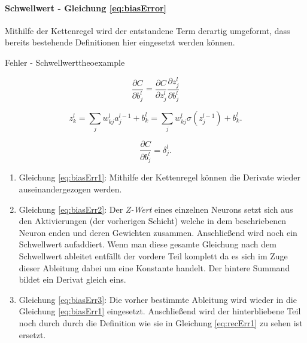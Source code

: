 \paragraph{Schwellwert - Gleichung \ref{eq:biasError}}
Mithilfe der Kettenregel wird der entstandene Term derartig umgeformt, dass bereits bestehende Definitionen hier eingesetzt werden können. 

\begin{myderivation}{Fehler - Schwellwert}{theoexample} 

\begin{equation} \label{eq:biasErr1}
\frac{\partial C}{\partial b^l_j} = \frac{\partial C}{\partial z^l_j} \frac{\partial z^l_j}{\partial b^l_j}
\end{equation}

\begin{equation} \label{eq:biasErr2}
z^{l}_k = \sum_j w^{l}_{kj} a^{l-1}_j +b^l_k = \sum_j w^l_{kj} \sigma(z^{l-1}_j) +b^l_k.
\end{equation}


\begin{equation} \label{eq:biasErr3}
\frac{\partial C}{\partial b^l_j} = \delta^l_j.
\end{equation}

\end{myderivation}


\begin{enumerate}

\item Gleichung \ref{eq:biasErr1}: Mithilfe der Kettenregel können die Derivate wieder auseinandergezogen werden.

\item Gleichung \ref{eq:biasErr2}: Der \emph{Z-Wert} eines einzelnen Neurons setzt sich aus den Aktivierungen (der vorherigen Schicht) welche in dem beschriebenen Neuron enden und deren Gewichten zusammen. Anschließend wird noch ein Schwellwert aufaddiert. Wenn man diese gesamte Gleichung nach dem Schwellwert ableitet entfällt der vordere Teil komplett da es sich im Zuge dieser Ableitung dabei um eine Konstante handelt. Der hintere Summand bildet ein Derivat gleich eins. 

\item Gleichung \ref{eq:biasErr3}: Die vorher bestimmte Ableitung wird wieder in die Gleichung \ref{eq:biasErr1} eingesetzt. Anschließend wird der hinterbliebene Teil noch durch durch die Definition wie sie in Gleichung \ref{eq:recErr1} zu sehen ist ersetzt. 

\end{enumerate}




